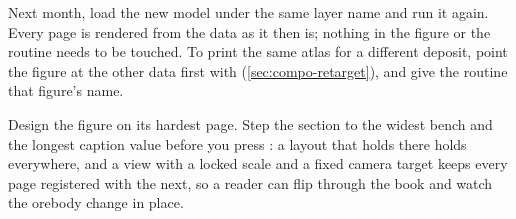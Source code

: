Next month, load the new model under the same layer name and run it again. Every page is rendered from the data as it then is; nothing in the figure or the routine needs to be touched. To print the same atlas for a different deposit, point the figure at the other data first with  (\cref{sec:compo-retarget}), and give the routine that figure's name.

\begin{tip}
Design the figure on its hardest page. Step the section to the widest bench and the longest caption value before you press : a layout that holds there holds everywhere, and a view with a locked scale and a fixed camera target keeps every page registered with the next, so a reader can flip through the book and watch the orebody change in place.
\end{tip}
